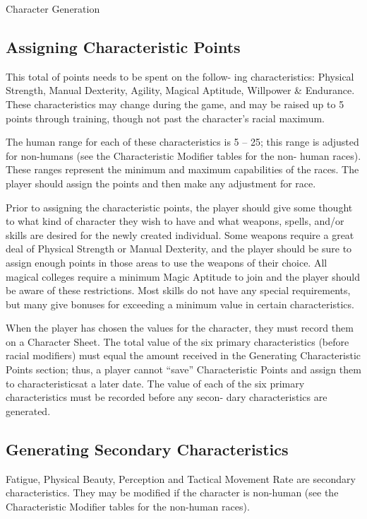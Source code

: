 \begin{Chapter}{Character Generation}
\subsection{Assigning Characteristic Points}

This total of points needs to be spent on the follow- ing
characteristics: Physical Strength, Manual Dexterity, Agility, Magical
Aptitude, Willpower \& Endurance.  These characteristics may change
during the game, and may be raised up to 5 points through training,
though not past the character’s racial maximum.

The human range for each of these characteristics is 5 – 25; this
range is adjusted for non-humans (see the Characteristic Modifier
tables for the non- human races). These ranges represent the minimum
and maximum capabilities of the races. The player should assign the
points and then make any adjustment for race.

Prior to assigning the characteristic points, the player should give
some thought to what kind of character they wish to have and what
weapons, spells, and/or skills are desired for the newly created
individual. Some weapons require a great deal of Physical Strength or
Manual Dexterity, and the player should be sure to assign enough
points in those areas to use the weapons of their choice. All magical
colleges require a minimum Magic Aptitude to join and the player
should be aware of these restrictions.  Most skills do not have any
special requirements, but many give bonuses for exceeding a minimum
value in certain characteristics.

When the player has chosen the values for the character, they must
record them on a Character Sheet. The total value of the six primary
characteristics (before racial modifiers) must equal the amount
received in the Generating Characteristic Points section; thus, a
player cannot “save” Characteristic Points and assign them to
characteristicsat a later date. The value of each of the six primary
characteristics must be recorded before any secon- dary
characteristics are generated.

\subsection{Generating Secondary Characteristics}

Fatigue, Physical Beauty, Perception and Tactical Movement Rate are
secondary characteristics.  They may be modified if the character is
non-human (see the Characteristic Modifier tables for the non-human
races).


\end{Chapter}

